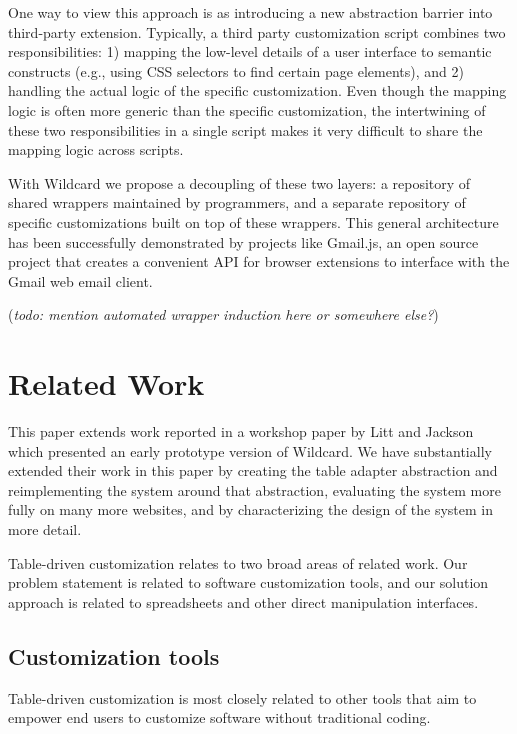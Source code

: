 \documentclass[sigplan,10pt,anonymous,review]{acmart}
\begin{document}
One way to view this approach is as introducing a new abstraction
barrier into third-party extension. Typically, a third party
customization script combines two responsibilities: 1) mapping the
low-level details of a user interface to semantic constructs (e.g.,
using CSS selectors to find certain page elements), and 2) handling the
actual logic of the specific customization. Even though the mapping
logic is often more generic than the specific customization, the
intertwining of these two responsibilities in a single script makes it
very difficult to share the mapping logic across scripts.

With Wildcard we propose a decoupling of these two layers: a repository
of shared wrappers maintained by programmers, and a separate repository
of specific customizations built on top of these wrappers. This general
architecture has been successfully demonstrated by projects like
Gmail.js, an open source project that creates a convenient API for
browser extensions to interface with the Gmail web email client.

(\emph{todo: mention automated wrapper induction here or somewhere
else?})

\hypertarget{sec:related-work}{%
\section{Related Work}\label{sec:related-work}}

This paper extends work reported in a workshop paper by Litt and Jackson
\citep{litt2020} which presented an early prototype version of Wildcard.
We have substantially extended their work in this paper by creating the
table adapter abstraction and reimplementing the system around that
abstraction, evaluating the system more fully on many more websites, and
by characterizing the design of the system in more detail.

Table-driven customization relates to two broad areas of related work.
Our problem statement is related to software customization tools, and
our solution approach is related to spreadsheets and other direct
manipulation interfaces.

\hypertarget{customization-tools}{%
\subsection{Customization tools}\label{customization-tools}}

Table-driven customization is most closely related to other tools that
aim to empower end users to customize software without traditional
coding.
\end{document}
